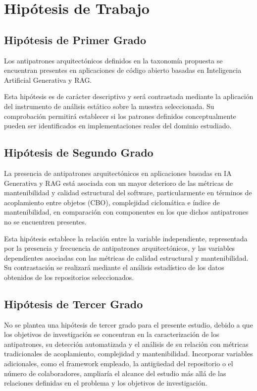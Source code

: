 \section{Hipótesis de Trabajo}
 
\subsection{Hipótesis de Primer Grado}
 
Los antipatrones arquitectónicos definidos en la taxonomía propuesta se encuentran presentes en aplicaciones de código abierto basadas en Inteligencia Artificial Generativa y RAG.

Esta hipótesis es de carácter descriptivo y será contrastada mediante la aplicación del instrumento de análisis estático sobre la muestra seleccionada. Su comprobación permitirá establecer si los patrones definidos conceptualmente pueden ser identificados en implementaciones reales del dominio estudiado.
 
\subsection{Hipótesis de Segundo Grado}
 
La presencia de antipatrones arquitectónicos en aplicaciones basadas en IA Generativa y RAG está asociada con un mayor deterioro de las métricas de mantenibilidad y calidad estructural del software, particularmente en términos de acoplamiento entre objetos (CBO), complejidad ciclomática e índice de mantenibilidad, en comparación con componentes en los que dichos antipatrones no se encuentren presentes.

Esta hipótesis establece la relación entre la variable independiente, representada por la presencia y frecuencia de antipatrones arquitectónicos, y las variables dependientes asociadas con las métricas de calidad estructural y mantenibilidad. Su contrastación se realizará mediante el análisis estadístico de los datos obtenidos de los repositorios seleccionados.
 
\subsection{Hipótesis de Tercer Grado}
 
No se plantea una hipótesis de tercer grado para el presente estudio, debido a que los objetivos de investigación se concentran en la caracterización de los antipatrones, su detección automatizada y el análisis de su relación con métricas tradicionales de acoplamiento, complejidad y mantenibilidad. Incorporar variables adicionales, como el framework empleado, la antigüedad del repositorio o el número de colaboradores, ampliaría el alcance del estudio más allá de las relaciones definidas en el problema y los objetivos de investigación.